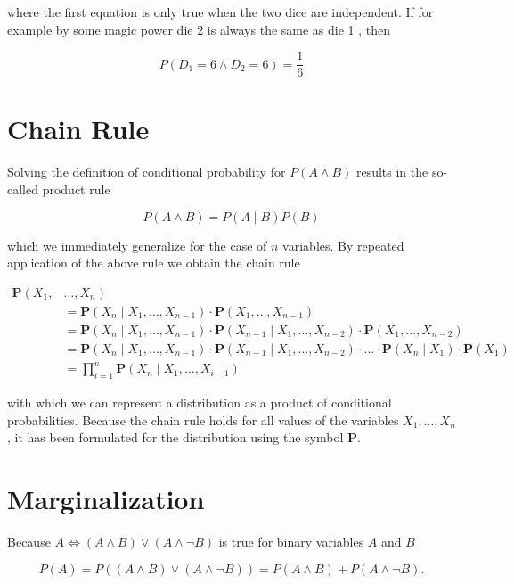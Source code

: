 \documentclass[10pt]{article}
\begin{document}
where the first equation is only true when the two dice are independent. If for example by some magic power die 2 is always the same as die 1 , then

$$
P\left(D_{1}=6 \wedge D_{2}=6\right)=\frac{1}{6}
$$

\section*{Chain Rule}
Solving the definition of conditional probability for $P(A \wedge B)$ results in the so-called product rule

$$
P(A \wedge B)=P(A \mid B) P(B)
$$

which we immediately generalize for the case of $n$ variables. By repeated application of the above rule we obtain the chain rule


\begin{align*}
\boldsymbol{P}\left(X_{1},\right. & \left.\ldots, X_{n}\right) \\
& =\boldsymbol{P}\left(X_{n} \mid X_{1}, \ldots, X_{n-1}\right) \cdot \boldsymbol{P}\left(X_{1}, \ldots, X_{n-1}\right) \\
& =\boldsymbol{P}\left(X_{n} \mid X_{1}, \ldots, X_{n-1}\right) \cdot \boldsymbol{P}\left(X_{n-1} \mid X_{1}, \ldots, X_{n-2}\right) \cdot \boldsymbol{P}\left(X_{1}, \ldots, X_{n-2}\right) \\
& =\boldsymbol{P}\left(X_{n} \mid X_{1}, \ldots, X_{n-1}\right) \cdot \boldsymbol{P}\left(X_{n-1} \mid X_{1}, \ldots, X_{n-2}\right) \cdot \ldots \cdot \boldsymbol{P}\left(X_{n} \mid X_{1}\right) \cdot \boldsymbol{P}\left(X_{1}\right) \\
& =\prod_{i=1}^{n} \boldsymbol{P}\left(X_{n} \mid X_{1}, \ldots, X_{i-1}\right) \tag{7.1}
\end{align*}


with which we can represent a distribution as a product of conditional probabilities. Because the chain rule holds for all values of the variables $X_{1}, \ldots, X_{n}$, it has been formulated for the distribution using the symbol $\boldsymbol{P}$.

\section*{Marginalization}
Because $A \Leftrightarrow(A \wedge B) \vee(A \wedge \neg B)$ is true for binary variables $A$ and $B$

$$
P(A)=P((A \wedge B) \vee(A \wedge \neg B))=P(A \wedge B)+P(A \wedge \neg B) .
$$
\end{document}
